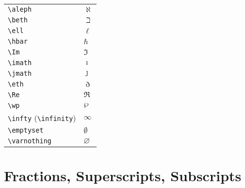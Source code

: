 \documentclass[text,xhtml,itex]{internet}
\begin{document}
\begin{tabular}{ll}
\verb+\aleph+                & \(\aleph\) \\
\verb+\beth+                 & \(\beth\) \\
\verb+\ell+                  & \(\ell\) \\
\verb+\hbar+                 & \(\hbar\) \\
\verb+\Im+                   & \(\Im\) \\
\verb+\imath+                & \(\imath\) \\
\verb+\jmath+                & \(\jmath\) \\
\verb+\eth+                  & \(\eth\) \\
\verb+\Re+                   & \(\Re\) \\
\verb+\wp+                   & \(\wp\) \\
\verb+\infty+ (\verb+\infinity+)  & \(\infty\) \\
\verb+\emptyset+  & \(\emptyset\) \\
\verb+\varnothing+           & \(\varnothing\)
\end{tabular}

\section{Fractions, Superscripts, Subscripts}
\end{document}
